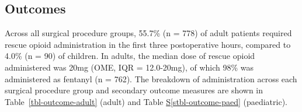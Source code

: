 \documentclass[
  letterpaper,
  DIV=11,
  numbers=noendperiod]{scrreprt}
\newcommand*\quartostblref[1]{Table \hyperref[#1]{S\ref{#1}}}
\begin{document}
\subsection{Outcomes}\label{outcomes}

Across all surgical procedure groups, 55.7\% (n = 778) of adult patients
required rescue opioid administration in the first three postoperative
hours, compared to 4.0\% (n = 90) of children. In adults, the median
dose of rescue opioid administered was 20mg (OME, IQR = 12.0-20mg), of
which 98\% was administered as fentanyl (n = 762). The breakdown of
administration across each surgical procedure group and secondary
outcome measures are shown in Table~\ref{tbl-outcome-adult} (adult) and
\quartostblref{stbl-outcome-paed} (paediatric).

\begin{table}

\caption{\label{tbl-outcome-adult}\textbf{Adult outcomes.} Outcome data
for adult patients stratified by surgical group. Return to theatre at
UCLH and representation to UCLH emergency department only, cumulative
measures at each time point. Eligible medications for discharge measured
as classified in Section~\ref{sec-sm-data-spec}.}

\centering{

}
\end{table}
\end{document}
